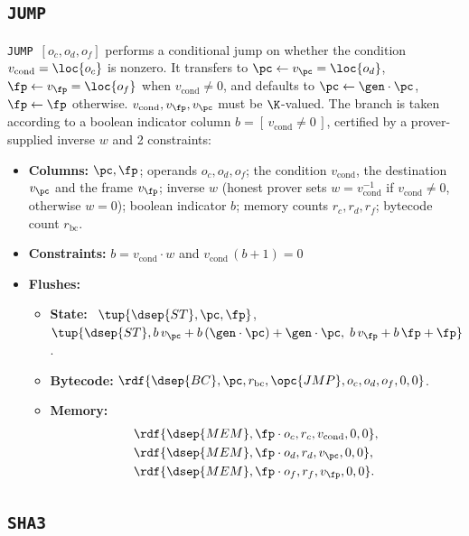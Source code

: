 \subsection{\texttt{JUMP}}\label{sec:tab-jump}

\texttt{JUMP}\ $[o_c,o_d,o_f]$ performs a conditional jump on whether the condition $v_{\mathrm{cond}}=\loc{o_c}$ is nonzero. It transfers to $\pc\gets v_{\pc} = \loc{o_d}$, $\fp\gets v_{\fp} = \loc{o_f}$ when $v_{\mathrm{cond}}\neq0$, and defaults to $\pc\gets\gen\cdot\pc$, $\fp\gets\fp$ otherwise. $v_{\mathrm{cond}}, v_{\fp}, v_{\pc}$ must be $\K$-valued. The branch is taken according to a boolean indicator column $b=[\,v_{\mathrm{cond}}\neq0\,]$, certified by a prover-supplied inverse $w$ and 2 constraints:

\begin{itemize}
\item \textbf{Columns:} $\pc,\fp$; operands $o_c,o_d,o_f$; the condition $v_{\mathrm{cond}}$, the destination $v_{\pc}$ and the frame $v_{\fp}$; inverse $w$ (honest prover sets $w = v_{\mathrm{cond}}^{-1}$ if $v_{\mathrm{cond}}\neq0$, otherwise $w=0$); boolean indicator $b$; memory counts $r_c,r_d,r_f$; bytecode count $r_{\mathrm{bc}}$.
\item \textbf{Constraints:}  $b=v_{\mathrm{cond}}\cdot w$ and $v_{\mathrm{cond}}\,(b+1)=0$
\item \textbf{Flushes:}
  \begin{itemize}
  \item \textbf{State:} \pull\ $\tup{\dsep{ST},\pc,\fp}$, \push\ $\tup{\dsep{ST},b\,v_{\pc}+b\,(\gen\cdot\pc)+\gen\cdot\pc,\;b\,v_{\fp}+b\,\fp+\fp}$.
  \item \textbf{Bytecode:} $\rdf{\dsep{BC},\pc,r_{\mathrm{bc}},\opc{JMP},o_c,o_d,o_f,0,0}$.
  \item \textbf{Memory:}
    \begin{align*}
      &\rdf{\dsep{MEM},\fp\cdot o_c,r_c,v_{\mathrm{cond}},0,0},\\
      &\rdf{\dsep{MEM},\fp\cdot o_d,r_d,v_{\pc},0,0},\\
      &\rdf{\dsep{MEM},\fp\cdot o_f,r_f,v_{\fp},0,0}.
    \end{align*}
  \end{itemize}
\end{itemize}

\subsection{\texttt{SHA3}}\label{sec:tab-sha3}

